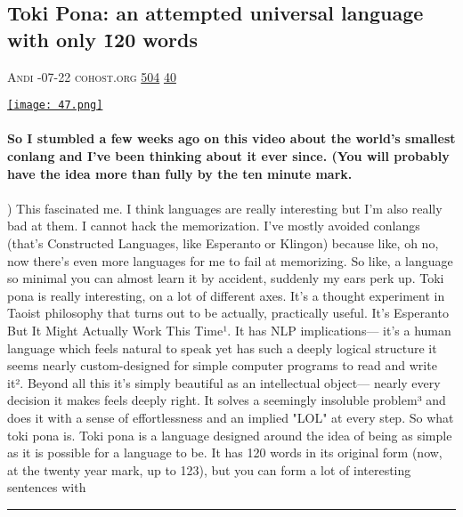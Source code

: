 \documentclass[10pt,a4paper]{article}
\begin{document}
\begin{multicols*}{2}

\noindent\begin{minipage}{\linewidth}
\subsection{Toki Pona: an attempted universal language with only \~120 words}
\textsc{\footnotesize
{\scriptsize\faUser}\space 
Andi 
{\scriptsize\faCalendar}-07-22 
{\scriptsize\faGlobe}\space 
cohost.org 
{\scriptsize\faThumbsOUp}\space 
\href{http://news.ycombinator.com/item?id=37113307\&utm\_term=comment}{504} 
{\scriptsize\faComments}\space 
\href{http://news.ycombinator.com/item?id=37113307\&utm\_term=comment}{40} 
}
\par\medskip\noindent
\href{https://cohost.org/mcc/post/59045-mi-kama-sona-e-toki?utm\_source=hackernewsletter\&utm\_medium=email\&utm\_term=learn}{
    \texttt{[image: 47.png]}
}
\end{minipage}
\paragraph{}
\textbf{So I stumbled a few weeks ago on this video about the world's smallest conlang and I've been thinking about it ever since.
(You will probably have the idea more than fully by the ten minute mark.}
\paragraph{}
)
This fascinated me. I think languages are really interesting but I'm also really bad at them. I cannot hack the memorization. I've mostly avoided conlangs (that's Constructed Languages, like Esperanto or Klingon) because like, oh no, now there's even more languages for me to fail at memorizing. So like, a language so minimal you can almost learn it by accident, suddenly my ears perk up.
Toki pona is really interesting, on a lot of different axes. It's a thought experiment in Taoist philosophy that turns out to be actually, practically useful. It's Esperanto But It Might Actually Work This Time¹. It has NLP implications— it's a human language which feels natural to speak yet has such a deeply logical structure it seems nearly custom-designed for simple computer programs to read and write it². Beyond all this it's simply beautiful as an intellectual object— nearly every decision it makes feels deeply right. It solves a seemingly insoluble problem³ and does it with a sense of effortlessness and an implied "LOL" at every step.
So what toki pona is. Toki pona is a language designed around the idea of being as simple as it is possible for a language to be. It has 120 words in its original form (now, at the twenty year mark, up to 123), but you can form a lot of interesting sentences with 
\par\noindent\textcolor{red}{\rule{\linewidth}{0.2mm}}
\vfill
\null
\noindent\begin{minipage}{\linewidth}

\end{minipage}
\end{multicols*}
\end{document}
